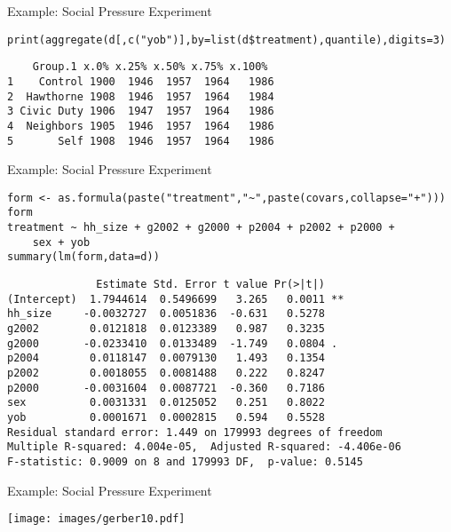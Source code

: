\documentclass{beamer}
\numberwithin{equation}{section}
\begin{document}
\begin{frame}[fragile]{Example: Social Pressure Experiment}

\footnotesize

\begin{verbatim}
print(aggregate(d[,c("yob")],by=list(d$treatment),quantile),digits=3)
\end{verbatim}

\pause

\begin{verbatim}
    Group.1 x.0% x.25% x.50% x.75% x.100%
1    Control 1900  1946  1957  1964   1986
2  Hawthorne 1908  1946  1957  1964   1984
3 Civic Duty 1906  1947  1957  1964   1986
4  Neighbors 1905  1946  1957  1964   1986
5       Self 1908  1946  1957  1964   1986
\end{verbatim}

\end{frame}

\begin{frame}[fragile]{Example: Social Pressure Experiment}

\footnotesize

\begin{verbatim}
form <- as.formula(paste("treatment","~",paste(covars,collapse="+")))
form
treatment ~ hh_size + g2002 + g2000 + p2004 + p2002 + p2000 +
    sex + yob
summary(lm(form,data=d))
\end{verbatim}

\pause

\begin{verbatim}
              Estimate Std. Error t value Pr(>|t|)
(Intercept)  1.7944614  0.5496699   3.265   0.0011 **
hh_size     -0.0032727  0.0051836  -0.631   0.5278
g2002        0.0121818  0.0123389   0.987   0.3235
g2000       -0.0233410  0.0133489  -1.749   0.0804 .
p2004        0.0118147  0.0079130   1.493   0.1354
p2002        0.0018055  0.0081488   0.222   0.8247
p2000       -0.0031604  0.0087721  -0.360   0.7186
sex          0.0031331  0.0125052   0.251   0.8022
yob          0.0001671  0.0002815   0.594   0.5528
Residual standard error: 1.449 on 179993 degrees of freedom
Multiple R-squared: 4.004e-05,  Adjusted R-squared: -4.406e-06
F-statistic: 0.9009 on 8 and 179993 DF,  p-value: 0.5145
\end{verbatim}

\end{frame}

\begin{frame}{Example: Social Pressure Experiment}

\centering
  \texttt{[image: images/gerber10.pdf]}

\end{frame}
\end{document}
